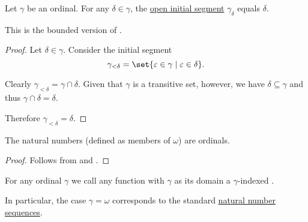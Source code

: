 \begin{proposition}\label{thm:initial_segment_of_ordinal}
  Let \( \gamma \) be an ordinal. For any \( \delta \in \gamma \), the \hyperref[def:partially_ordered_set_interval/ray]{open initial segment} \( \gamma_\delta \) equals \( \delta \).

  This is the bounded version of .
\end{proposition}
\begin{proof}
  Let \( \delta \in \gamma \). Consider the initial segment
  \begin{equation*}
    \gamma_{<\delta} = \set{ \varepsilon \in \gamma \given \varepsilon \in \delta }.
  \end{equation*}

  Clearly \( \gamma_{<\delta} = \gamma \cap \delta \). Given that \( \gamma \) is a transitive set, however, we have \( \delta \subseteq \gamma \) and thus \( \gamma \cap \delta = \delta \).

  Therefore \( \gamma_{<\delta} = \delta \).
\end{proof}

\begin{corollary}\label{thm:natural_numbers_are_ordinals}
  The natural numbers (defined as members of \hyperref[thm:smallest_inductive_set_existence]{\( \omega \)}) are ordinals.
\end{corollary}
\begin{proof}
  Follows from  and .
\end{proof}

\begin{definition}\label{def:transfinite_sequence}
  For any ordinal \( \gamma \) we call any function with \( \gamma \) as its domain a \( \gamma \)-indexed .

  In particular, the case \( \gamma = \omega \) corresponds to the standard \hyperref[def:natural_sequence]{natural number sequences}.
\end{definition}

